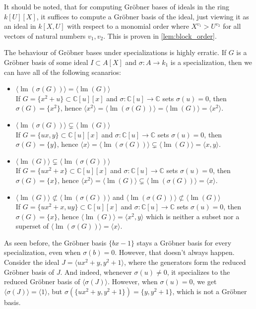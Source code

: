 \documentclass[a4paper, 12pt]{article}
\newcommand{\C}{\mathbb{C}}
\DeclareMathOperator{\LM}{lm}
\theoremstyle{changedot}
\theoremstyle{changedotbreak}
\theoremstyle{nonumberplain}
\begin{document}
It should be noted, that for computing Gröbner bases of ideals in the ring $k[U][X]$, it suffices to compute a Gröbner basis of the ideal, just viewing it as an ideal in $k[X, U]$ with respect to a monomial order where $X^{v_{1}} > U^{v_{2}}$ for all vectors of natural numbers $v_{1}, v_{2}$. This is proven in \ref{lem:block_order}.

\begin{example}\upshape
  The behaviour of Gröbner bases under specializations is highly erratic. If $G$ is a Gröbner basis of some ideal $I \subset A[X]$ and $\sigma : A \to k_{1}$ is a specialization, then we can have all of the following scanarios:
  \begin{itemize}
    \item $\langle \LM(\sigma(G)) \rangle = \langle \LM(G) \rangle$ \\ If $G = \{x^{2} + u\} \subset \C[u][x]$ and $\sigma : \C[u] \to \C$ sets $\sigma(u) = 0$, then $\sigma(G) = \{x^{2}\}$, hence $\langle x^{2} \rangle = \langle \LM(\sigma(G)) \rangle = \langle \LM(G) \rangle = \langle x^{2} \rangle$.

    \item $\langle \LM(\sigma(G)) \rangle \subsetneq \langle \LM(G) \rangle$ \\ If $G = \{ux, y\} \subset \C[u][x]$ and $\sigma : \C[u] \to \C$ sets $\sigma(u) = 0$, then $\sigma(G) = \{y\}$, hence $\langle x \rangle = \langle \LM(\sigma(G)) \rangle \subsetneq \langle \LM(G) \rangle = \langle x, y \rangle$.

    \item $\langle \LM(G) \rangle \subsetneq \langle \LM(\sigma(G)) \rangle$ \\ If $G = \{ux^{2} + x\} \subset \C[u][x]$ and $\sigma : \C[u] \to \C$ sets $\sigma(u) = 0$, then $\sigma(G) = \{x\}$, hence $\langle x^{2} \rangle = \langle \LM(G) \rangle \subsetneq \langle \LM(\sigma(G)) \rangle = \langle x \rangle$.

    \item $\langle \LM(G) \rangle \nsubset \langle \LM(\sigma(G)) \rangle$ and $\langle \LM(\sigma(G)) \rangle \nsubset \langle \LM(G) \rangle$ \\ If $G = \{ux^{2} + x, uy\} \subset \C[u][x]$ and $\sigma : \C[u] \to \C$ sets $\sigma(u) = 0$, then $\sigma(G) = \{x\}$, hence $\langle \LM(G) \rangle = \langle x^{2}, y \rangle$ which is neither a subset nor a superset of $\langle \LM(\sigma(G)) \rangle = \langle x \rangle$.
  \end{itemize}

  As seen before, the Gröbner basis $\{bx - 1\}$ stays a Gröbner basis for every specialization, even when $\sigma(b) = 0$. However, that doesn't always happen. Consider the ideal $J = \langle ux^{2} + y, y^{2} + 1 \rangle$, where the generators form the reduced Gröbner basis of $J$. And indeed, whenever $\sigma(u) \neq 0$, it specializes to the reduced Gröbner basis of $\langle \sigma(J) \rangle$. However, when $\sigma(u) = 0$, we get $\langle \sigma(J) \rangle = \langle 1 \rangle$, but $\sigma(\{ux^{2} + y, y^{2} + 1\}) = \{y, y^{2} + 1\}$, which is not a Gröbner basis.
\end{example}
\end{document}
